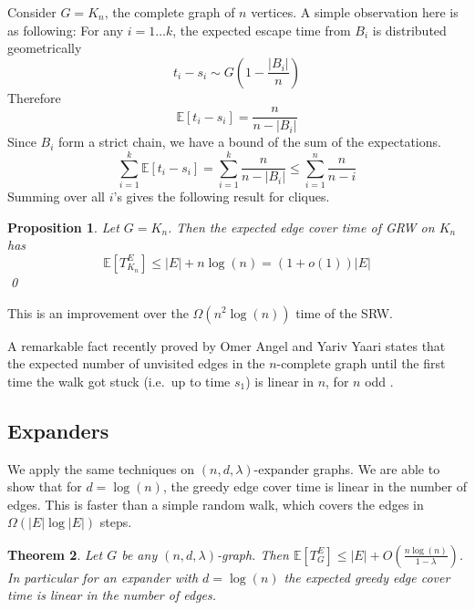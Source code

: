 \documentclass[12pt,a4paper]{article}
\newcommand{\0}{{\bf 0}}
\newcommand{\E}{{\mathbb E}}
\newtheorem{theorem}{Theorem}[section]
\newtheorem{proposition}[theorem]{Proposition}
\begin{document}
    Consider $G = K_n$, the complete graph of $n$ vertices.
    A simple observation here is as following:
    For any $i = 1 \dots k$, the expected escape time from $B_i$ is distributed geometrically
    \[
        t_i - s_i \sim G(1 - \frac{|B_i|}{n})
    \]
    Therefore
    \[
        \E[t_i - s_i] = \frac{n}{n - |B_i|}
    \]
    Since $B_i$ form a strict chain, we have a bound of the sum of the expectations.
    \[
        \sum_{i=1}^k \E[t_i - s_i]  = \sum_{i=1}^k \frac{n}{n - |B_i|} \leq \sum_{i=1}^n \frac{n}{n - i}
    \]
    Summing over all $i$'s gives the following result for cliques.
    \begin{proposition}\label{thm:clique}
        Let $G = K_n$. Then the expected edge cover time of GRW on $K_n$ has
        \[
            \E[T^E_{K_n}] \leq |E| + n \log(n) = (1 + o(1))|E|
        \]\qed
    \end{proposition}
    This is an improvement over the $\Omega (n^2 \log(n))$ time of the SRW.

    A remarkable fact recently proved by Omer Angel and Yariv Yaari states that the expected number of unvisited edges
    in the $n$-complete graph until the first time the walk got stuck (i.e.\ up to time $s_1$) is linear in $n$, for $n$ odd \cite{AngelYaari}.

\subsection{Expanders}\label{subsec:expanders}

    We apply the same techniques on $(n,d,\lambda)$-expander graphs.
    We are able to show that for $d = \log(n)$, the greedy edge cover time is linear in the number of edges.
    This is faster than a simple random walk, which covers the edges in $\Omega ( |E| \log |E| )$ steps.

    \begin{theorem}\label{thm:spectral_bound}
        Let $G$ be any $(n, d, \lambda)$-graph.
        Then $\E[T^E_G] \leq |E| + O \left( \frac{n \log(n)}{1-\lambda} \right)$.
        In particular for an expander with $d = \log(n)$ the expected greedy edge cover time is linear in the number of edges.
    \end{theorem}
\end{document}
